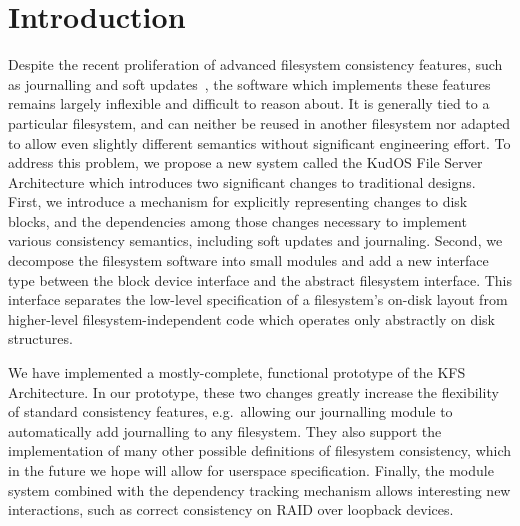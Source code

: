 \section*{Introduction}
\label{sec:intro}

Despite the recent proliferation of advanced filesystem consistency
features, such as journalling and soft updates~\cite{ganger00soft},
the software which implements these features remains largely
inflexible and difficult to reason about. It is generally tied to a
particular filesystem, and can neither be reused in another filesystem
nor adapted to allow even slightly different semantics without
significant engineering effort. To address this problem, we propose a
new system called the KudOS File Server Architecture which introduces
two significant changes to traditional designs. First, we introduce a
mechanism for explicitly representing changes to disk blocks, and the
dependencies among those changes necessary to implement various
consistency semantics, including soft updates and journaling. Second,
we decompose the filesystem software into small modules and add a new
interface type between the block device interface and the abstract
filesystem interface.  This interface separates the low-level
specification of a filesystem's on-disk layout from higher-level
filesystem-independent code which operates only abstractly on disk
structures.

We have implemented a mostly-complete, functional prototype of the KFS
Architecture. In our prototype, these two changes greatly increase the
flexibility of standard consistency features, e.g.~allowing our journalling
module to automatically add journalling to any filesystem. They also support
the implementation of many other possible definitions of filesystem
consistency, which in the future we hope will allow for userspace
specification. Finally, the module system combined with the dependency
tracking mechanism allows interesting new interactions, such as correct
consistency on RAID over loopback devices.
